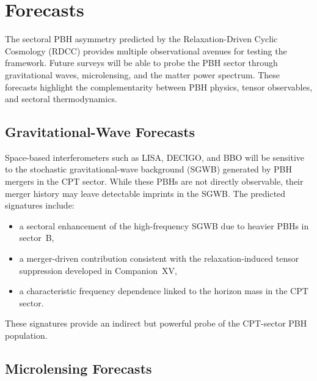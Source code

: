 \documentclass[11pt,a4paper]{article}
\begin{document}

\section{Forecasts}

The sectoral PBH asymmetry predicted by the Relaxation-Driven Cyclic Cosmology (RDCC)
provides multiple observational avenues for testing the framework. Future surveys will be able
to probe the PBH sector through gravitational waves, microlensing, and the matter power
spectrum. These forecasts highlight the complementarity between PBH physics, tensor
observables, and sectoral thermodynamics.


\subsection{Gravitational-Wave Forecasts}

Space-based interferometers such as LISA, DECIGO, and BBO will be sensitive to the stochastic
gravitational-wave background (SGWB) generated by PBH mergers in the CPT sector. While
these PBHs are not directly observable, their merger history may leave detectable imprints in
the SGWB. The predicted signatures include:

\begin{itemize}
\item a sectoral enhancement of the high-frequency SGWB due to heavier PBHs in sector~B,
\item a merger-driven contribution consistent with the relaxation-induced tensor suppression
developed in Companion~XV,
\item a characteristic frequency dependence linked to the horizon mass in the CPT sector.
\end{itemize}

These signatures provide an indirect but powerful probe of the CPT-sector PBH population.


\subsection{Microlensing Forecasts}
\end{document}
